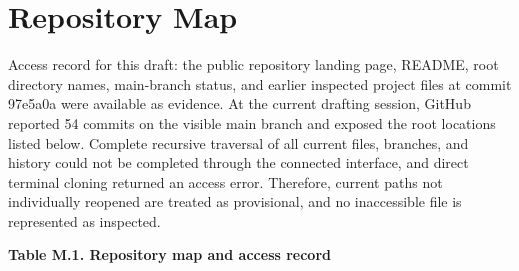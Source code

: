 \chapter{Repository Map}\label{ch:repository-map}

Access record for this draft: the public repository landing page,
README, root directory names, main-branch status, and earlier inspected
project files at commit 97e5a0a were available as evidence. At the
current drafting session, GitHub reported 54 commits on the visible main
branch and exposed the root locations listed below. Complete recursive
traversal of all current files, branches, and history could not be
completed through the connected interface, and direct terminal cloning
returned an access error. Therefore, current paths not individually
reopened are treated as provisional, and no inaccessible file is
represented as inspected.

\par\medskip\noindent\singlespacing
{}
\textbf{Table M.1. Repository map and access record}\par

